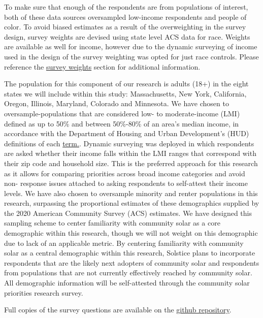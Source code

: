 \documentclass[
]{article}
\begin{document}
To make sure that enough of the respondents are from populations of
interest, both of these data sources oversampled low-income respondents
and people of color. To avoid biased estimates as a result of the
overweighting in the survey design, survey weights are devised using
state level ACS data for race. Weights are available as well for income,
however due to the dynamic surveying of income used in the design of the
survey weighting was opted for just race controls. Please reference the
\href{https://jake-ford.github.io/SETO_Data_Analysis/survey_weights.html}{survey
weights} section for additional information.

The population for this component of our research is adults (18+) in the
eight states we will include within this study: Massachusetts, New York,
California, Oregon, Illinois, Maryland, Colorado and Minnesota. We have
chosen to oversample-populations that are considered low- to
moderate-income (LMI) defined as up to 50\% and between 50\%-80\% of an
area's median income, in accordance with the Department of Housing and
Urban Development's (HUD) definitions of each
\href{https://www.hudexchange.info/programs/acs-low-mod-summary-data/}{term.}.
Dynamic surveying was deployed in which respondents are asked whether
their income falls within the LMI ranges that correspond with their zip
code and household size. This is the preferred approach for this
research as it allows for comparing priorities across broad income
categories and avoid non- response issues attached to asking respondents
to self-attest their income levels. We have also chosen to oversample
minority and renter populations in this research, surpassing the
proportional estimates of these demographics supplied by the 2020
American Community Survey (ACS) estimates. We have designed this
sampling scheme to center familiarity with community solar as a core
demographic within this research, though we will not weight on this
demographic due to lack of an applicable metric. By centering
familiarity with community solar as a central demographic within this
research, Solstice plans to incorporate respondents that are the likely
next adopters of community solar and respondents from populations that
are not currently effectively reached by community solar. All
demographic information will be self-attested through the community
solar priorities research survey.

Full copies of the survey questions are available on the
\href{https://github.com/Jake-Ford/SETO_Data_Analysis/tree/main/Qualtrics\%20Survey}{github
repository}.
\end{document}
